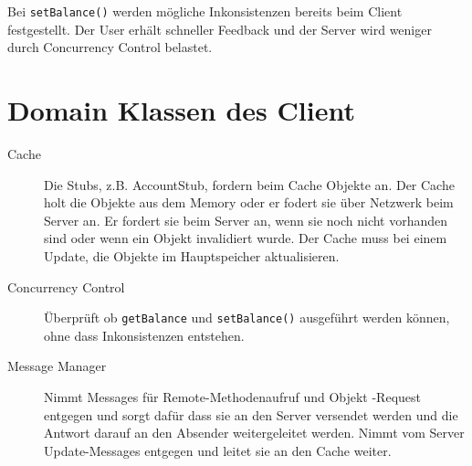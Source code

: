 Bei \verb+setBalance()+ werden mögliche Inkonsistenzen bereits beim Client festgestellt. Der User erhält schneller Feedback und der Server wird weniger durch Concurrency Control belastet.

\section{Domain Klassen des Client}
\label{sec:domain-klassen}

\begin{description}
\item[Cache] Die Stubs, z.B. AccountStub, fordern beim Cache Objekte an. Der Cache holt die Objekte aus dem Memory oder er fodert sie über Netzwerk beim Server an. Er fordert sie beim Server an, wenn sie noch nicht vorhanden sind oder wenn ein Objekt invalidiert wurde. Der Cache muss bei einem Update, die Objekte im Hauptspeicher aktualisieren.
\item[Concurrency Control] Überprüft ob \verb+getBalance+ und \verb+setBalance()+ ausgeführt werden können, ohne dass Inkonsistenzen entstehen.

\item[Message Manager] Nimmt Messages für Remote-Methodenaufruf und Ob\-jekt\- -Request entgegen und sorgt dafür dass sie an den Server versendet werden und die Antwort darauf an den Absender weitergeleitet werden. Nimmt vom Server Update-Messages entgegen und leitet sie an den Cache weiter.

\end{description}

